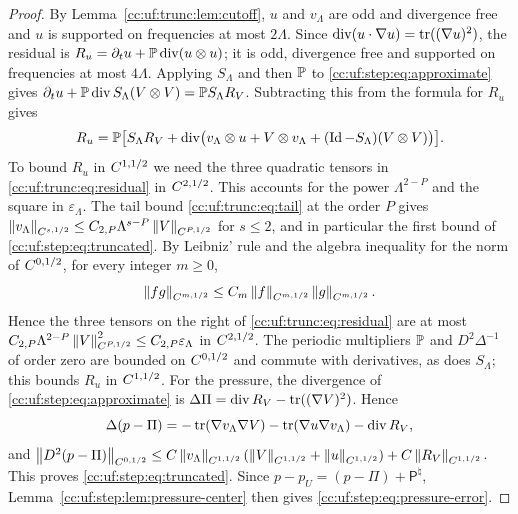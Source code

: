 \begin{proof}
By Lemma~\ref{cc:uf:trunc:lem:cutoff}, $u$ and $v_\Lambda$ are odd and
divergence free and $u$ is supported on frequencies at most $2\Lambda$.
Since $\operatorname{div}(u\cdot\nabla u)=\operatorname{tr}((\nabla u)^2)$, the residual is
$R_u=\partial_tu+\mathbb P\operatorname{div}(u\otimes u)$; it is odd, divergence free and
supported on frequencies at most $4\Lambda$.
Applying $S_\Lambda$ and then $\mathbb P$ to \eqref{cc:uf:step:eq:approximate}
gives
$\partial_tu+\mathbb P\operatorname{div} S_\Lambda(V\otimes V)=\mathbb P S_\Lambda R_V$.
Subtracting this from the formula for $R_u$ gives
\begin{equation}\label{cc:uf:trunc:eq:residual}
 R_u=\mathbb P\bigl[S_\Lambda R_V
   +\operatorname{div}\bigl(v_\Lambda\otimes u+V\otimes v_\Lambda
                +(\operatorname{Id}-S_\Lambda)(V\otimes V)\bigr)\bigr].
\end{equation}
To bound $R_u$ in $C^{1,1/2}$ we need the three quadratic tensors in
\eqref{cc:uf:trunc:eq:residual} in $C^{2,1/2}$. This accounts for
the power $\Lambda^{2-P}$ and the square in $\varepsilon_\Lambda$.
The tail bound \eqref{cc:uf:trunc:eq:tail} at the order $P$ gives
$\left\lVert v_\Lambda\right\rVert_{C^{s,1/2}}
\le C_{2,P}\Lambda^{s-P}\left\lVert V\right\rVert_{C^{P,1/2}}$ for
$s\le2$, and in particular the first bound of
\eqref{cc:uf:step:eq:truncated}. By Leibniz' rule and the algebra
inequality for the norm of $C^{0,1/2}$, for every integer $m\ge0$,
\begin{equation}\label{cc:holder:product-growth}
 \left\lVert fg\right\rVert_{C^{m,1/2}}\le C_m\left\lVert f\right\rVert_{C^{m,1/2}}\left\lVert g\right\rVert_{C^{m,1/2}}.
\end{equation}
Hence the three tensors on the right of
\eqref{cc:uf:trunc:eq:residual} are at most
$C_{2,P}\Lambda^{2-P}\left\lVert V\right\rVert_{C^{P,1/2}}^2\le C_{2,P}\varepsilon_\Lambda$ in
$C^{2,1/2}$. The periodic
multipliers $\mathbb P$ and $D^2\Delta^{-1}$ of order zero are bounded
on $C^{0,1/2}$ and commute with derivatives, as does $S_\Lambda$; this
bounds $R_u$ in $C^{1,1/2}$.
For the pressure, the divergence of \eqref{cc:uf:step:eq:approximate} is
$\Delta\Pi=\operatorname{div} R_V-\operatorname{tr}((\nabla V)^2)$. Hence
\[
 \Delta(p-\Pi)
 =-\operatorname{tr}(\nabla v_\Lambda\nabla V)-\operatorname{tr}(\nabla u\nabla v_\Lambda)
  -\operatorname{div} R_V,
\]
and $\left\lVert D^2(p-\Pi)\right\rVert_{C^{0,1/2}}
\le C\left\lVert v_\Lambda\right\rVert_{C^{1,1/2}}(\left\lVert V\right\rVert_{C^{1,1/2}}+\left\lVert u\right\rVert_{C^{1,1/2}})
+C\left\lVert R_V\right\rVert_{C^{1,1/2}}$. This proves \eqref{cc:uf:step:eq:truncated}.
Since $p-p_U=(p-\Pi)+\mathsf P^\natural$,
Lemma~\ref{cc:uf:step:lem:pressure-center} then gives
\eqref{cc:uf:step:eq:pressure-error}.
\end{proof}
